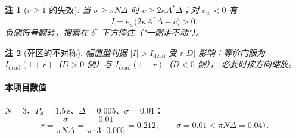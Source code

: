 \documentclass[11pt,a4paper]{article}
\newtheorem{remark}{注}
\begin{document}
\begin{remark}[$r\ge 1$ 的失效]
当 $\sigma\ge\pi N\Delta$ 时 $c\ge 2\kappa A^{*}\Delta$；对 $e_w<0$ 有
\begin{equation}
I=e_w\bigl(2\kappa A^{*}\Delta-c\bigr)>0 ,
\label{eq:esfail}
\end{equation}
负侧符号翻转，搜索在 $\delta^{*}$ 下方停住（"一侧走不动"）。
\end{remark}

\begin{remark}[死区的不对称]
幅值型判据 $|I|>I_{\mathrm{dead}}$ 受 $r|D|$ 影响：等价门限为
$I_{\mathrm{dead}}(1+r)$（$D>0$ 侧）与 $I_{\mathrm{dead}}(1-r)$（$D<0$ 侧），
必要时按方向缩放。
\end{remark}

\paragraph{本项目数值}
$N=3$、$P_d=1.5\,\mathrm{s}$、$\Delta=0.005$、$\sigma=0.01$：
\begin{equation}
r=\frac{\sigma}{\pi N\Delta}=\frac{0.01}{\pi\cdot 3\cdot 0.005}=0.212,
\qquad
\sigma=0.01<\pi N\Delta=0.047 .
\end{equation}
\end{document}
